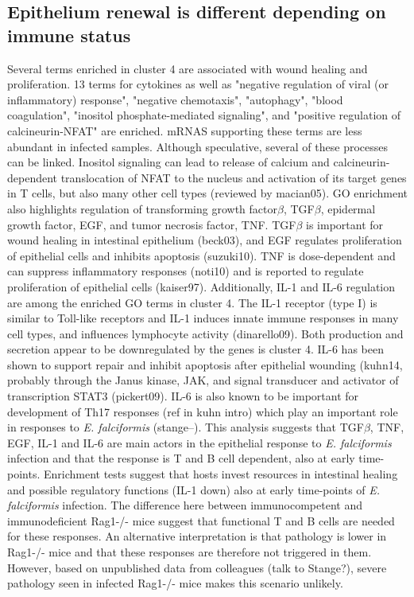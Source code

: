 \documentclass{bmcart}
\begin{document}
\subsection*{Epithelium renewal is different depending on immune status}
Several terms enriched in cluster 4 are associated with wound healing and proliferation. 13 terms for cytokines as well as "negative regulation of viral (or inflammatory) response", "negative chemotaxis", "autophagy", "blood coagulation", "inositol phosphate-mediated signaling", and "positive regulation of calcineurin-NFAT" are enriched. mRNAS supporting these terms are less abundant in infected samples. Although speculative, several of these processes can be linked. Inositol signaling can lead to release of calcium and calcineurin-dependent translocation of NFAT to the nucleus and activation of its target genes in T cells, but also many other cell types (reviewed by macian05). GO enrichment also highlights regulation of transforming growth factor$\beta$, TGF$\beta$, epidermal growth factor, EGF, and tumor necrosis factor, TNF. TGF$\beta$ is important for wound healing in intestinal epithelium (beck03), and EGF regulates proliferation of epithelial cells and inhibits apoptosis (suzuki10). TNF is dose-dependent and can suppress inflammatory responses (noti10) and is reported to regulate proliferation of epithelial cells (kaiser97). Additionally, IL-1 and IL-6 regulation are among the enriched GO terms in cluster 4. The IL-1 receptor (type I) is similar to Toll-like receptors and IL-1 induces innate immune responses in many cell types, and influences lymphocyte activity (dinarello09). Both production and secretion appear to be downregulated by the genes is cluster 4. IL-6 has been shown to support repair and inhibit apoptosis after epithelial wounding (kuhn14, probably through the Janus kinase, JAK, and signal transducer and activator of transcription STAT3 (pickert09). IL-6 is also known to be important for development of Th17 responses (ref in kuhn intro) which play an important role in responses to \textit{E. falciformis} (stange--). This analysis suggests that TGF$\beta$, TNF, EGF, IL-1 and IL-6 are main actors in the epithelial response to \textit{E. falciformis} infection and that the response is T and B cell dependent, also at early time-points. Enrichment tests suggest that hosts invest resources in intestinal healing and possible regulatory functions (IL-1 down) also at early time-points of \textit{E. falciformis} infection. The difference here between immunocompetent and immunodeficient Rag1-/- mice suggest that functional T and B cells are needed for these responses. An alternative interpretation is that pathology is lower in Rag1-/- mice and that these responses are therefore not triggered in them. However, based on unpublished data from colleagues (talk to Stange?), severe pathology seen in infected Rag1-/- mice makes this scenario unlikely.
\end{document}

